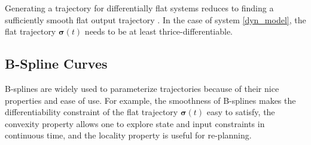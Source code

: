\documentclass[journal,10pt]{IEEEtran}
\newcommand{\vect}[1]{\boldsymbol{\mathbf{#1}}}
\newif\ifdraft
\newcommand{\XX}[1]{\ifdraft{\color{red}[{\bf XX}: #1]}\fi}
\newcommand{\VF}[1]{\ifdraft{\color{blue}[{\bf VF}: #1]}\fi}
\begin{document}
Generating a trajectory for differentially flat systems reduces to finding a sufficiently smooth flat output trajectory \cite{murray1998real}. In the case of system \eqref{dyn_model}, the flat trajectory $\vect{\sigma}(t)$ needs to be at least thrice-differentiable.



\subsection{B-Spline Curves} \label{B-Splines}
B-splines are widely used to parameterize trajectories because of their nice properties and ease of use. For example, the smoothness of B-splines makes the differentiability constraint of the flat trajectory $\vect{\sigma}(t)$ easy to satisfy, the convexity property allows one to explore state and input constraints in continuous time, and the locality property is useful for re-planning.
\end{document}
